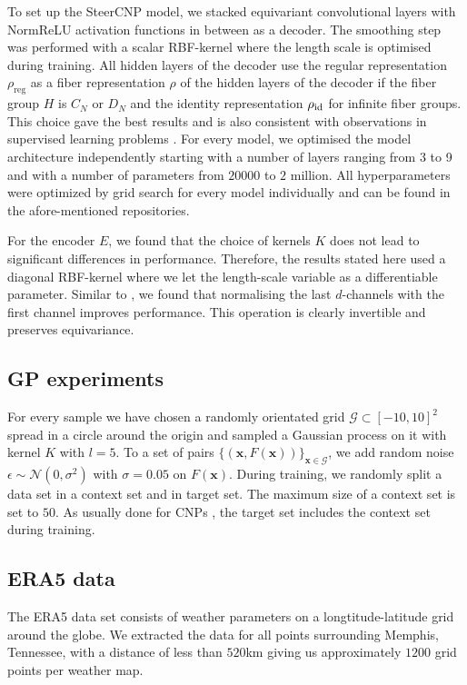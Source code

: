 To set up the SteerCNP model, we stacked equivariant convolutional layers with NormReLU activation functions in between as a decoder.
The smoothing step was performed with a scalar RBF-kernel where the length scale is optimised during training.
All hidden layers of the decoder use the regular representation $\rho_{\text{reg}}$ as a fiber representation $\rho$ of the hidden layers of the decoder if the fiber group $H$ is $C_N$ or $D_N$ and the identity representation $\rho_{\operatorname{id}}$ for infinite fiber groups.
This choice gave the best results and is also consistent with observations in supervised learning problems \parencite{E2Steerable}.
For every model, we optimised the model architecture independently starting with a number of layers ranging from 3 to 9 and with a number of parameters from $20000$ to $2$ million.
All hyperparameters were optimized by grid search for every model individually and can be found in the afore-mentioned repositories.

For the encoder $E$, we found that the choice of kernels $K$ does not lead to significant differences in performance.
Therefore, the results stated here used a diagonal RBF-kernel where we let the length-scale variable as a differentiable parameter.
Similar to \textcite{ConvCNP}, we found that normalising the last $d$-channels with the first channel improves performance.
This operation is clearly invertible and preserves equivariance.

\subsection{GP experiments}
For every sample we have chosen a randomly orientated grid $\mathcal{G}\subset [-10,10]^2$ spread in a circle around the origin and sampled a Gaussian process on it with kernel $K$ with $l=5$.
To a set of pairs $\{(\mathbf{x},F(\mathbf{x}))\}_{\mathbf{x}\in\mathcal{G}}$, we add random noise $\epsilon\sim\mathcal{N}(0,\sigma^2)$ with $\sigma=0.05$ on $F(\mathbf{x})$.
During training, we randomly split a data set in a context set and in target set.
The maximum size of a context set is set to $50$.
As usually done for CNPs \parencite{CNPs}, the target set includes the context set during training.

\subsection{ERA5 data}
The ERA5 data set consists of weather parameters on a longtitude-latitude grid around the globe.
We extracted the data for all points surrounding Memphis, Tennessee, with a distance of less than $520$km giving us approximately $1200$ grid points per weather map.

